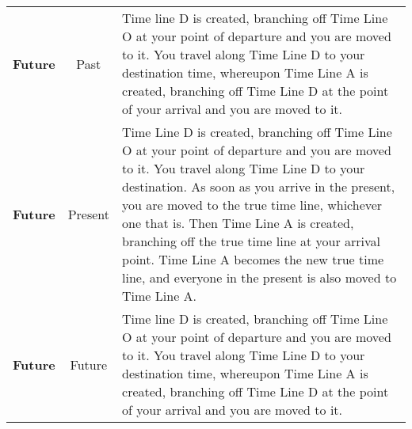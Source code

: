 \begin {table}[H]
\begin{tabularx}{\columnwidth}{>{\bfseries}ccY}
	Future & Past & Time line D is created, branching off Time Line O at your point of departure and you are moved to it. You travel along Time Line D to your destination time, whereupon Time Line A is created, branching off Time Line D at the point of your arrival and you are moved to it.\\
	Future & Present & Time Line D is created, branching off Time Line O at your point of departure and you are moved to it. You travel along Time Line D to your destination. As soon as you arrive in the present, you are moved to the true time line, whichever one that is. Then Time Line A is created, branching off the true time line at your arrival point. Time Line A becomes the new true time line, and everyone in the present is also moved to Time Line A.\\
	Future & Future & Time line D is created, branching off Time Line O at your point of departure and you are moved to it. You travel along Time Line D to your destination time, whereupon Time Line A is created, branching off Time Line D at the point of your arrival and you are moved to it.
  \end {tabularx}
\end {table}

